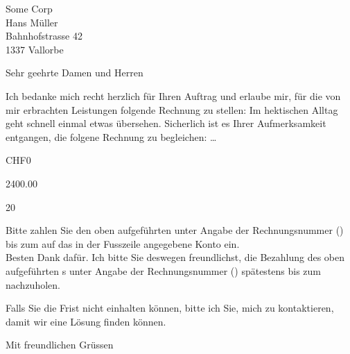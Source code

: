 \documentclass[DIN,SN,10pt,DIV=18,_rechnung]{scrlttr2}
\begin{document}
  \begin{letter}{
      Some Corp \\
      Hans Müller \\
      Bahnhofstrasse 42 \\
      1337 Vallorbe
    }

    \opening{Sehr geehrte Damen und Herren}
    \thispagestyle{plain}

    \ifnum{}
      Ich bedanke mich recht herzlich für Ihren Auftrag und erlaube mir, für die
      von mir erbrachten Leistungen folgende Rechnung zu stellen:
    \else
      \ifnum{}
        Im hektischen Alltag geht schnell einmal etwas übersehen.
        Sicherlich ist es Ihrer Aufmerksamkeit entgangen, die folgene Rechnung zu begleichen:
      \else
        \dots
      \fi
    \fi

    \begin{invoice}{CHF}{0}

       {2400.00}
      \STExpenses


       {20}

    \end{invoice}

    \begin{samepage}
      \ifnum{}
        Bitte zahlen Sie den oben aufgeführten {\Total} unter Angabe der
        Rechnungsnummer () bis zum  auf
        das in der Fusszeile angegebene Konto ein.\\
        Besten Dank dafür.
      \else
        Ich bitte Sie deswegen freundlichst, die Bezahlung des oben aufgeführten
        {\Total}s unter Angabe der Rechnungsnummer () spätestens
        bis zum  nachzuholen.

        Falls Sie die Frist nicht einhalten können, bitte ich Sie, mich zu
        kontaktieren, damit wir eine Lösung finden können.
      \fi

      \closing{Mit freundlichen Grüssen}

    \end{samepage}
 \end{letter}
\end{document}
